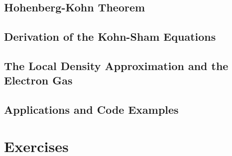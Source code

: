 \subsection{Hohenberg-Kohn Theorem}

\subsection{Derivation of the Kohn-Sham Equations}

\subsection{The Local Density Approximation and the Electron Gas}

\subsection{Applications and Code Examples}


\section{Exercises}

